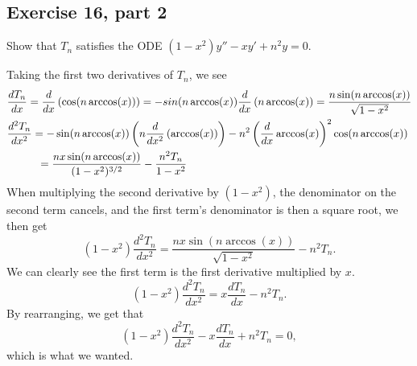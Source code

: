 \newpage
\subsection{Exercise 16, part 2}
Show that $T_n$ satisfies the ODE $(1 - x^2)y'' - xy' + n^2y = 0$.
\partbreak
\begin{solution}

    Taking the first two derivatives of $T_n$, we see
    \begin{align*}
        &\frac{dT_n}{dx} = \frac{d}{dx}\left(\cos(n\arccos(x))\right) = -sin(n\arccos(x))\frac{d}{dx}\left(n\arccos(x)\right) = \frac{n\sin(n\arccos(x))}{\sqrt{1 - x^2}}\\
        &\frac{d^2T_n}{dx^2} = -\sin(n\arccos(x))\left(n\frac{d}{dx^2}\left(\arccos(x)\right)\right) - n^2\left(\frac{d}{dx}\arccos(x)\right)^2\cos(n\arccos(x))\\
        &\hspace{10mm} = \frac{nx\sin(n\arccos(x))}{(1 - x^2)^{3/2}} - \frac{n^2T_n}{1 - x^2}
    \end{align*}
    When multiplying the second derivative by $(1 - x^2)$, the denominator on the second term cancels, and the first term's denominator is then a square root, we then get
    \[(1 - x^2)\frac{d^2T_n}{dx^2} = \frac{nx\sin(n\arccos(x))}{\sqrt{1 - x^2}} - n^2T_n.\]
    We can clearly see the first term is the first derivative multiplied by $x$. 
    \[(1 - x^2)\frac{d^2T_n}{dx^2} = x\frac{dT_n}{dx} - n^2T_n.\]
    By rearranging, we get that
    \[(1 - x^2)\frac{d^2T_n}{dx^2} - x\frac{dT_n}{dx} + n^2T_n = 0,\]
    which is what we wanted.
\end{solution}


